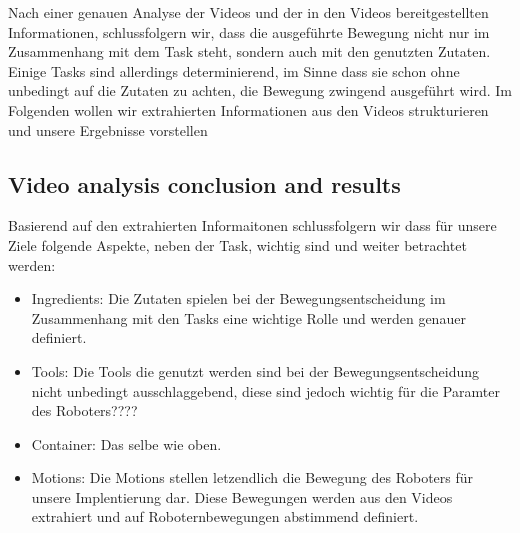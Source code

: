 Nach einer genauen Analyse der Videos und der in den Videos bereitgestellten Informationen, schlussfolgern wir, dass die ausgeführte Bewegung nicht nur im Zusammenhang mit dem Task steht, sondern auch mit den genutzten Zutaten. Einige Tasks sind allerdings determinierend, im Sinne dass sie schon ohne unbedingt auf die Zutaten zu achten, die Bewegung zwingend ausgeführt wird.
Im Folgenden wollen wir extrahierten Informationen aus den Videos strukturieren und unsere Ergebnisse vorstellen
\subsection*{Video analysis conclusion and results}

Basierend auf den extrahierten Informaitonen schlussfolgern wir dass für unsere Ziele folgende Aspekte, neben der Task, wichtig sind und weiter betrachtet werden:
\begin{itemize}
  \item Ingredients: Die Zutaten spielen bei der Bewegungsentscheidung im Zusammenhang mit den Tasks eine wichtige Rolle und werden genauer definiert.
  \item Tools: Die Tools die genutzt werden sind bei der Bewegungsentscheidung nicht unbedingt ausschlaggebend, diese sind jedoch wichtig für die Paramter des Roboters????
  \item Container: Das selbe wie oben.
  \item Motions: Die Motions stellen letzendlich die Bewegung des Roboters für unsere Implentierung dar. Diese Bewegungen werden aus den Videos extrahiert und auf Roboternbewegungen abstimmend definiert.
\end{itemize}

